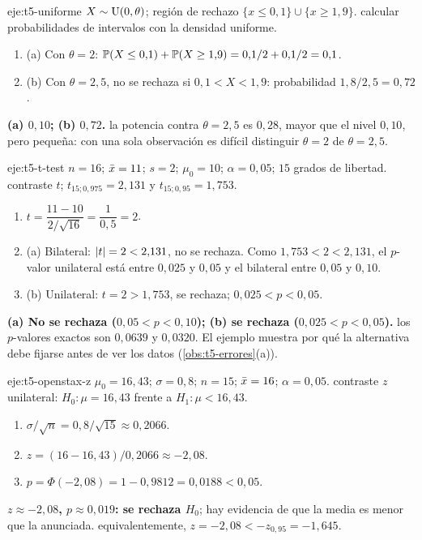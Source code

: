 \begin{solucion}{eje:t5-uniforme}
\datos $X\sim\operatorname{U}(0,\theta)$; región de rechazo $\{x\le0{,}1\}\cup\{x\ge1{,}9\}$.
\planteamiento calcular probabilidades de intervalos con la densidad uniforme.
\pasos
\begin{enumerate}[label=\arabic*.]
  \item (a) Con $\theta=2$: $\mathbb{P}(X\le0{,}1)+\mathbb{P}(X\ge1{,}9)=0{,}1/2+0{,}1/2=0{,}1$.
  \item (b) Con $\theta=2{,}5$, no se rechaza si $0{,}1<X<1{,}9$: probabilidad $1{,}8/2{,}5=0{,}72$.
\end{enumerate}
\resultado \textbf{(a) $0{,}10$; (b) $0{,}72$.}
\comprobacion la potencia contra $\theta=2{,}5$ es $0{,}28$, mayor que el nivel $0{,}10$, pero pequeña: con una sola observación es difícil distinguir $\theta=2$ de $\theta=2{,}5$.
\end{solucion}

\begin{solucion}{eje:t5-t-test}
\datos $n=16$; $\bar{x}=11$; $s=2$; $\mu_0=10$; $\alpha=0{,}05$; $15$ grados de libertad.
\planteamiento contraste $t$; $t_{15;0{,}975}=2{,}131$ y $t_{15;0{,}95}=1{,}753$.
\pasos
\begin{enumerate}[label=\arabic*.]
  \item $t=\dfrac{11-10}{2/\sqrt{16}}=\dfrac{1}{0{,}5}=2$.
  \item (a) Bilateral: $\lvert t\rvert=2<2{,}131$, no se rechaza. Como $1{,}753<2<2{,}131$, el $p$-valor unilateral está entre $0{,}025$ y $0{,}05$ y el bilateral entre $0{,}05$ y $0{,}10$.
  \item (b) Unilateral: $t=2>1{,}753$, se rechaza; $0{,}025<p<0{,}05$.
\end{enumerate}
\resultado \textbf{(a) No se rechaza ($0{,}05<p<0{,}10$); (b) se rechaza ($0{,}025<p<0{,}05$).}
\comprobacion los $p$-valores exactos son $0{,}0639$ y $0{,}0320$. El ejemplo muestra por qué la alternativa debe fijarse antes de ver los datos (\cref{obs:t5-errores}(a)).
\end{solucion}

\begin{solucion}{eje:t5-openstax-z}
\datos $\mu_0=16{,}43$; $\sigma=0{,}8$; $n=15$; $\bar{x}=16$; $\alpha=0{,}05$.
\planteamiento contraste $z$ unilateral: $H_0:\mu=16{,}43$ frente a $H_1:\mu<16{,}43$.
\pasos
\begin{enumerate}[label=\arabic*.]
  \item $\sigma/\sqrt n=0{,}8/\sqrt{15}\approx0{,}2066$.
  \item $z=(16-16{,}43)/0{,}2066\approx-2{,}08$.
  \item $p=\Phi(-2{,}08)=1-0{,}9812=0{,}0188<0{,}05$.
\end{enumerate}
\resultado \textbf{$z\approx-2{,}08$, $p\approx0{,}019$: se rechaza $H_0$}; hay evidencia de que la media es menor que la anunciada.
\comprobacion equivalentemente, $z=-2{,}08<-z_{0{,}95}=-1{,}645$.
\end{solucion}

